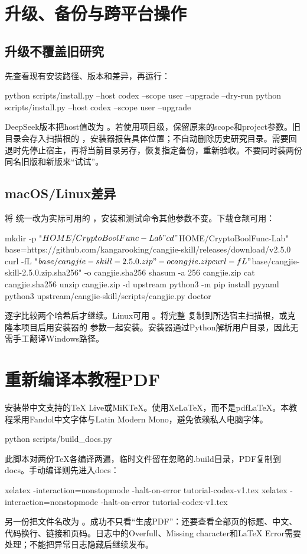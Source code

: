 \section{升级、备份与跨平台操作}
\subsection{升级不覆盖旧研究}
先查看现有安装路径、版本和差异，再运行：
\begin{code}
python scripts/install.py --host codex --scope user --upgrade --dry-run
python scripts/install.py --host codex --scope user --upgrade
\end{code}
DeepSeek版本把host值改为 。若使用项目级，保留原来的scope和project参数。旧目录会存入扫描根的 ，安装器报告具体位置；不自动删除历史研究目录。需要回退时先停止宿主，再将当前目录另存，恢复指定备份，重新验收。不要同时装两份同名旧版和新版来“试试”。

\subsection{macOS/Linux差异}
将  统一改为实际可用的 ，安装和测试命令其他参数不变。下载仓颉可用：
\begin{code}
mkdir -p "$HOME/CryptoBoolFunc-Lab"
cd "$HOME/CryptoBoolFunc-Lab"
base=https://github.com/kangarooking/cangjie-skill/releases/download/v2.5.0
curl -fL "$base/cangjie-skill-2.5.0.zip" -o cangjie.zip
curl -fL "$base/cangjie-skill-2.5.0.zip.sha256" -o cangjie.sha256
shasum -a 256 cangjie.zip
cat cangjie.sha256
unzip cangjie.zip -d upstream
python3 -m pip install pyyaml
python3 upstream/cangjie-skill/scripts/cangjie.py doctor
\end{code}
逐字比较两个哈希后才继续。Linux可用 。将完整  复制到所选宿主扫描根，或克隆本项目后用安装器的  参数一起安装。安装器通过Python解析用户目录，因此无需手工翻译Windows路径。

\section{重新编译本教程PDF}
安装带中文支持的TeX Live或MiKTeX。使用XeLaTeX，而不是pdfLaTeX。本教程采用Fandol中文字体与Latin Modern Mono，避免依赖私人电脑字体。
\begin{code}
python scripts/build_docs.py
\end{code}
此脚本对两份TeX各编译两遍，临时文件留在忽略的.build目录，PDF复制到docs。手动编译则先进入docs：
\begin{code}
xelatex -interaction=nonstopmode -halt-on-error tutorial-codex-v1.tex
xelatex -interaction=nonstopmode -halt-on-error tutorial-codex-v1.tex
\end{code}
另一份把文件名改为 。成功不只看“生成PDF”：还要查看全部页的标题、中文、代码换行、链接和页码。日志中的Overfull、Missing character和LaTeX Error需要处理；不能把异常日志隐藏后继续发布。

